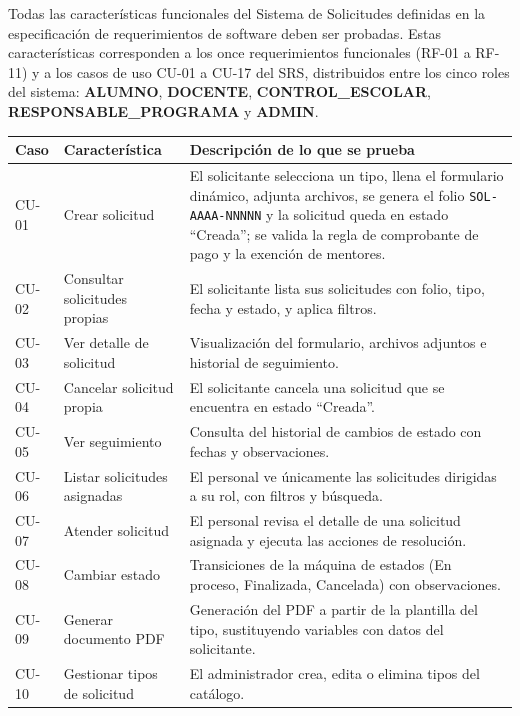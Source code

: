 \documentclass[12pt,letterpaper]{report}
\begin{document}
Todas las características funcionales del Sistema de Solicitudes definidas en la
especificación de requerimientos de software deben ser probadas. Estas
características corresponden a los once requerimientos funcionales (RF-01 a
RF-11) y a los casos de uso CU-01 a CU-17 del SRS, distribuidos entre los cinco
roles del sistema: \textbf{ALUMNO}, \textbf{DOCENTE},
\textbf{CONTROL\_ESCOLAR}, \textbf{RESPONSABLE\_PROGRAMA} y \textbf{ADMIN}.

\begin{center}
\renewcommand{\arraystretch}{1.3}
\begin{tabularx}{\textwidth}{|C{1.6cm}|L{4.6cm}|X|}
\hline
{}
\textbf{Caso} & \textbf{Característica} & \textbf{Descripción de lo que se prueba} \\
\hline
CU-01 & Crear solicitud & El solicitante selecciona un tipo, llena el formulario
dinámico, adjunta archivos, se genera el folio \texttt{SOL-AAAA-NNNNN} y la
solicitud queda en estado ``Creada''; se valida la regla de comprobante de pago
y la exención de mentores. \\
\hline
CU-02 & Consultar solicitudes propias & El solicitante lista sus solicitudes con
folio, tipo, fecha y estado, y aplica filtros. \\
\hline
CU-03 & Ver detalle de solicitud & Visualización del formulario, archivos
adjuntos e historial de seguimiento. \\
\hline
CU-04 & Cancelar solicitud propia & El solicitante cancela una solicitud que se
encuentra en estado ``Creada''. \\
\hline
CU-05 & Ver seguimiento & Consulta del historial de cambios de estado con fechas
y observaciones. \\
\hline
CU-06 & Listar solicitudes asignadas & El personal ve únicamente las solicitudes
dirigidas a su rol, con filtros y búsqueda. \\
\hline
CU-07 & Atender solicitud & El personal revisa el detalle de una solicitud
asignada y ejecuta las acciones de resolución. \\
\hline
CU-08 & Cambiar estado & Transiciones de la máquina de estados (En proceso,
Finalizada, Cancelada) con observaciones. \\
\hline
CU-09 & Generar documento PDF & Generación del PDF a partir de la plantilla del
tipo, sustituyendo variables con datos del solicitante. \\
\hline
CU-10 & Gestionar tipos de solicitud & El administrador crea, edita o elimina
tipos del catálogo. \\

\end{tabularx}
\end{center}
\end{document}
